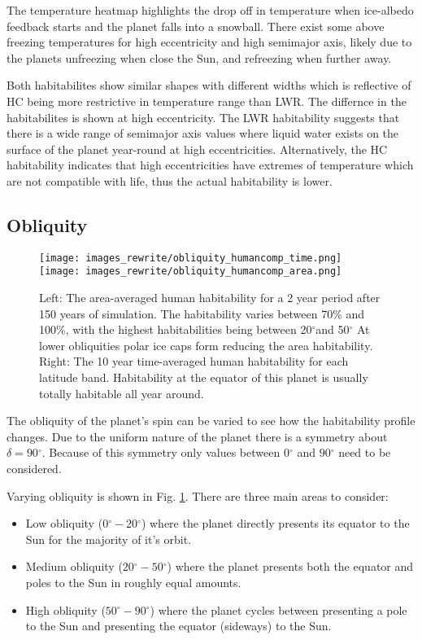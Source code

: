 \documentclass[12pt, onecolumn]{revtex4-2}    %
\newcommand{\degrees}{\ensuremath{^{\circ}}}
\begin{document}
The temperature heatmap highlights the drop off in temperature when ice-albedo feedback starts and the planet falls into a snowball.
There exist some above freezing temperatures for high eccentricity and high semimajor axis, likely due to the planets unfreezing when close the Sun, and refreezing when further away.

Both habitabilites show similar shapes with different widths which is reflective of HC being more restrictive in temperature range than LWR.
The differnce in the habitabilites is shown at high eccentricity.
The LWR habitability suggests that there is a wide range of semimajor axis values where liquid water exists on the surface of the planet year-round at high eccentricities.
Alternatively, the HC habitability indicates that high eccentricities have extremes of temperature which are not compatible with life, thus the actual habitability is lower.



\subsection{Obliquity} \label{ssec:qualitative_obliquity}
\begin{figure}
  \texttt{[image: images\_rewrite/obliquity\_humancomp\_time.png]}
  \texttt{[image: images\_rewrite/obliquity\_humancomp\_area.png]}
  \caption{
    Left: The area-averaged human habitability for a 2 year period after 150 years of simulation.
    The habitability varies between 70\% and 100\%, with the highest habitabilities being between 20\degrees and 50\degrees
    At lower obliquities polar ice caps form reducing the area habitability.
    Right: The 10 year time-averaged human habitability for each latitude band.
    Habitability at the equator of this planet is usually totally habitable all year around.
  }
  \label{fig:qualitative_obliquity}
\end{figure}

The obliquity of the planet's spin can be varied to see how the habitability profile changes.
Due to the uniform nature of the planet there is a symmetry about $\delta = 90\degrees$.
Because of this symmetry only values between $0\degrees$ and $90\degrees$ need to be considered.

Varying obliquity is shown in Fig. \ref{fig:qualitative_obliquity}.
There are three main areas to consider:
\begin{itemize}
  \item Low obliquity ($0\degrees - 20\degrees$) where the planet directly presents its equator to the Sun for the majority of it's orbit.
  \item Medium obliquity ($20\degrees - 50\degrees$) where the planet presents both the equator and poles to the Sun in roughly equal amounts.
  \item High obliquity ($50\degrees - 90\degrees$) where the planet cycles between presenting a pole to the Sun and presenting the equator (sideways) to the Sun.
\end{itemize}
\end{document}
